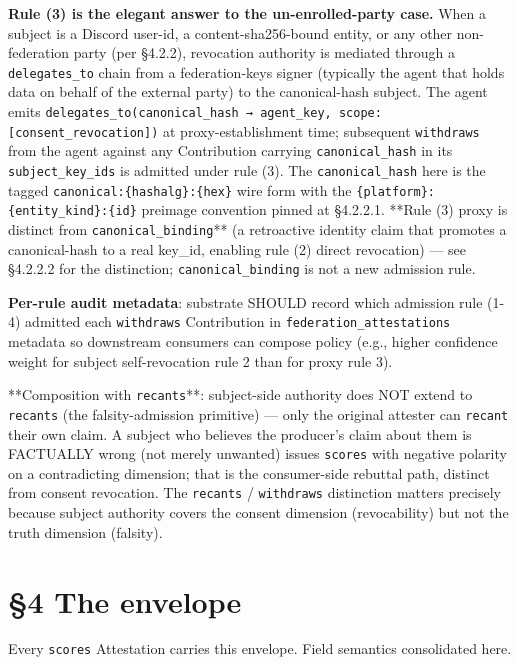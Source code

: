 \documentclass[10pt]{article}
\begin{document}
\textbf{Rule (3) is the elegant answer to the un-enrolled-party case.} When a subject is a Discord user-id, a content-sha256-bound entity, or any other non-federation party (per §4.2.2), revocation authority is mediated through a \texttt{delegates\_to} chain from a federation-keys signer (typically the agent that holds data on behalf of the external party) to the canonical-hash subject. The agent emits \texttt{delegates\_to(canonical\_hash → agent\_key, scope: [consent\_revocation])} at proxy-establishment time; subsequent \texttt{withdraws} from the agent against any Contribution carrying \texttt{canonical\_hash} in its \texttt{subject\_key\_ids} is admitted under rule (3). The \texttt{canonical\_hash} here is the tagged \texttt{canonical:\{hashalg\}:\{hex\}} wire form with the \texttt{\{platform\}:\{entity\_kind\}:\{id\}} preimage convention pinned at §4.2.2.1. **Rule (3) proxy is distinct from \texttt{canonical\_binding}** (a retroactive identity claim that promotes a canonical-hash to a real key\_id, enabling rule (2) direct revocation) — see §4.2.2.2 for the distinction; \texttt{canonical\_binding} is not a new admission rule.


\textbf{Per-rule audit metadata}: substrate SHOULD record which admission rule (1-4) admitted each \texttt{withdraws} Contribution in \texttt{federation\_attestations} metadata so downstream consumers can compose policy (e.g., higher confidence weight for subject self-revocation rule 2 than for proxy rule 3).


**Composition with \texttt{recants}**: subject-side authority does NOT extend to \texttt{recants} (the falsity-admission primitive) — only the original attester can \texttt{recant} their own claim. A subject who believes the producer's claim about them is FACTUALLY wrong (not merely unwanted) issues \texttt{scores} with negative polarity on a contradicting dimension; that is the consumer-side rebuttal path, distinct from consent revocation. The \texttt{recants} / \texttt{withdraws} distinction matters precisely because subject authority covers the consent dimension (revocability) but not the truth dimension (falsity).




\clearpage


\section*{§4 The envelope}


Every \texttt{scores} Attestation carries this envelope. Field semantics consolidated here.
\end{document}
